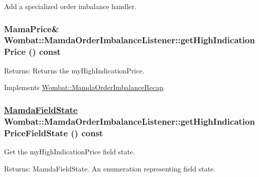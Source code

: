 Add a specialized order imbalance handler. 

\hypertarget{classWombat_1_1MamdaOrderImbalanceListener_596c5c1e351924b74e0f81af784a45a1}{
\subsubsection[getHighIndicationPrice]{\setlength{\rightskip}{0pt plus 5cm}Mama\-Price\& Wombat::Mamda\-Order\-Imbalance\-Listener::get\-High\-Indication\-Price () const}}
\label{classWombat_1_1MamdaOrderImbalanceListener_596c5c1e351924b74e0f81af784a45a1}


\begin{Desc}
\item[Returns:]Returns the my\-High\-Indication\-Price. \end{Desc}


Implements \hyperlink{classWombat_1_1MamdaOrderImbalanceRecap_1d1c151048651f612b924b30d378db9f}{Wombat::Mamda\-Order\-Imbalance\-Recap}.\hypertarget{classWombat_1_1MamdaOrderImbalanceListener_6272673c1cf08580d09ec73d0e458734}{
\subsubsection[getHighIndicationPriceFieldState]{\setlength{\rightskip}{0pt plus 5cm}\hyperlink{namespaceWombat_93aac974f2ab713554fd12a1fa3b7d2a}{Mamda\-Field\-State} Wombat::Mamda\-Order\-Imbalance\-Listener::get\-High\-Indication\-Price\-Field\-State () const}}
\label{classWombat_1_1MamdaOrderImbalanceListener_6272673c1cf08580d09ec73d0e458734}


Get the my\-High\-Indication\-Price field state. 

\begin{Desc}
\item[Returns:]Mamda\-Field\-State. An enumeration representing field state. \end{Desc}


